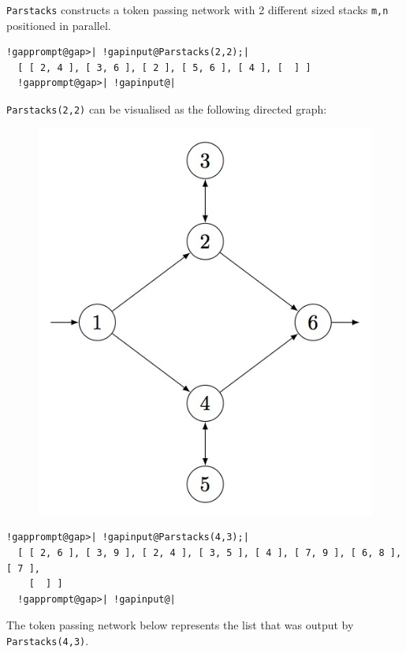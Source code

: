 \documentclass[a4paper,11pt]{report}
\begin{document}
{{{ \texttt{Parstacks} constructs a token passing network with 2 different sized stacks \texttt{m,n} positioned in parallel. 
\begin{Verbatim}[commandchars=!@|,fontsize=\small,frame=single,label=Example]
  !gapprompt@gap>| !gapinput@Parstacks(2,2);|
  [ [ 2, 4 ], [ 3, 6 ], [ 2 ], [ 5, 6 ], [ 4 ], [  ] ]
  !gapprompt@gap>| !gapinput@|
\end{Verbatim}
  \texttt{Parstacks(2,2)} can be visualised as the following directed graph: \begin{figure}[H]
\begin{center} \leavevmode \includegraphics[scale=0.75]{img/ps22.jpg}
\end{center} \end{figure}   
\begin{Verbatim}[commandchars=!@|,fontsize=\small,frame=single,label=Example]
  !gapprompt@gap>| !gapinput@Parstacks(4,3);|
  [ [ 2, 6 ], [ 3, 9 ], [ 2, 4 ], [ 3, 5 ], [ 4 ], [ 7, 9 ], [ 6, 8 ], [ 7 ],
    [  ] ]
  !gapprompt@gap>| !gapinput@|
\end{Verbatim}
  The token passing network below represents the list that was output by \texttt{Parstacks(4,3)}. \begin{figure}[H] \begin{center} \leavevmode

\end{center}
\end{figure}}}}
\end{document}
